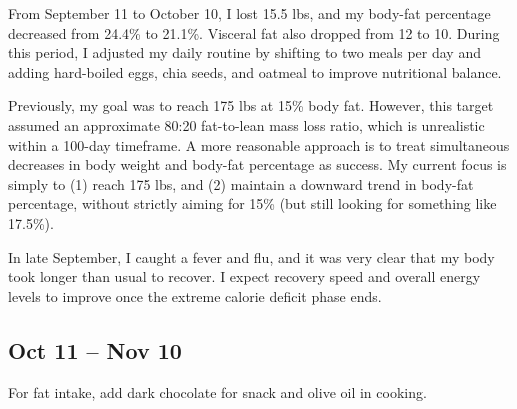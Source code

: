 From September 11 to October 10, I lost 15.5 lbs, and my body-fat percentage decreased from 24.4\% to 21.1\%. Visceral fat also dropped from 12 to 10. During this period, I adjusted my daily routine by shifting to two meals per day and adding hard-boiled eggs, chia seeds, and oatmeal to improve nutritional balance.

Previously, my goal was to reach 175 lbs at 15\% body fat. However, this target assumed an approximate 80:20 fat-to-lean mass loss ratio, which is unrealistic within a 100-day timeframe. A more reasonable approach is to treat simultaneous decreases in body weight and body-fat percentage as success. My current focus is simply to (1) reach 175 lbs, and (2) maintain a downward trend in body-fat percentage, without strictly aiming for 15\% (but still looking for something like 17.5\%).

In late September, I caught a fever and flu, and it was very clear that my body took longer than usual to recover. I expect recovery speed and overall energy levels to improve once the extreme calorie deficit phase ends.


\subsection{Oct 11 -- Nov 10}

For fat intake, add dark chocolate for snack and olive oil in cooking. 



